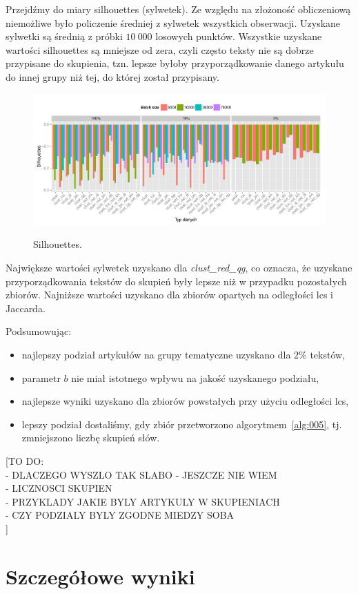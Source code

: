 \documentclass{praca1}
\begin{document}
Przejdźmy do miary silhouettes (sylwetek). Ze względu na złożoność obliczeniową niemożliwe było policzenie średniej z sylwetek wszystkich obserwacji. Uzyskane sylwetki są średnią z próbki $10\ 000$ losowych punktów. Wszystkie uzyskane wartości silhouettes są mniejsze od zera, czyli często teksty nie są dobrze przypisane do skupienia, tzn. lepsze byłoby przyporządkowanie danego artykułu do innej grupy niż tej, do której został przypisany.

\begin{figure}[!h]
  \centering
  \includegraphics[width=400pt]{plot14.pdf}\\
  \caption{Silhouettes.}\label{plot:009}
\end{figure}

Największe wartości sylwetek uzyskano dla \emph{clust\_red\_qg}, co oznacza, że uzyskane przyporządkowania tekstów do skupień były lepsze niż w przypadku pozostałych zbiorów. Najniższe wartości uzyskano dla zbiorów opartych na odległości lcs i Jaccarda.

Podsumowując:
\begin{itemize}
\item najlepszy podział artykułów na grupy tematyczne uzyskano dla $2\%$ tekstów,
\item parametr $b$ nie miał istotnego wpływu na jakość uzyskanego podziału,
\item najlepsze wyniki uzyskano dla zbiorów powstałych przy użyciu odległości lcs,
\item lepszy podział dostaliśmy, gdy zbiór przetworzono algorytmem~\ref{alg:005}, tj. zmniejszono liczbę skupień słów.
\end{itemize}

[TO DO:\\
- DLACZEGO WYSZLO TAK SLABO - JESZCZE NIE WIEM\\
- LICZNOSCI SKUPIEN\\
- PRZYKLADY JAKIE BYLY ARTYKULY W SKUPIENIACH\\
- CZY PODZIALY BYLY ZGODNE MIEDZY SOBA\\
]

\section{Szczegółowe wyniki}







\end{document}
